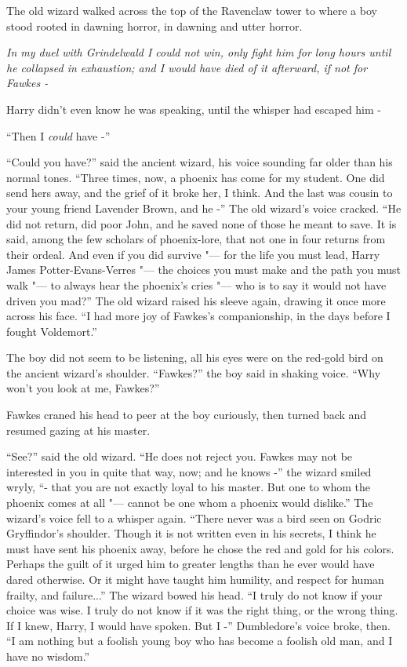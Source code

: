 The old wizard walked across the top of the Ravenclaw tower to where a
boy stood rooted in dawning horror, in dawning and utter horror.

\emph{In my duel with Grindelwald I could not win, only fight him for
long hours until he collapsed in exhaustion; and I would have died of it
afterward, if not for Fawkes -}

Harry didn't even know he was speaking, until the whisper had escaped
him -

``Then I \emph{could} have -''

``Could you have?'' said the ancient wizard, his voice sounding far
older than his normal tones. ``Three times, now, a phoenix has come for
my student. One did send hers away, and the grief of it broke her, I
think. And the last was cousin to your young friend Lavender Brown, and
he -'' The old wizard's voice cracked. ``He did not return, did poor
John, and he saved none of those he meant to save. It is said, among the
few scholars of phoenix-lore, that not one in four returns from their
ordeal. And even if you did survive "--- for the life you must lead, Harry
James Potter-Evans-Verres "--- the choices you must make and the path you
must walk "--- to always hear the phoenix's cries "--- who is to say it would
not have driven you mad?'' The old wizard raised his sleeve again,
drawing it once more across his face. ``I had more joy of Fawkes's
companionship, in the days before I fought Voldemort.''

The boy did not seem to be listening, all his eyes were on the red-gold
bird on the ancient wizard's shoulder. ``Fawkes?'' the boy said in
shaking voice. ``Why won't you look at me, Fawkes?''

Fawkes craned his head to peer at the boy curiously, then turned back
and resumed gazing at his master.

``See?'' said the old wizard. ``He does not reject you. Fawkes may not
be interested in you in quite that way, now; and he knows -'' the wizard
smiled wryly, ``- that you are not exactly loyal to his master. But one
to whom the phoenix comes at all "--- cannot be one whom a phoenix would
dislike.'' The wizard's voice fell to a whisper again. ``There never was
a bird seen on Godric Gryffindor's shoulder. Though it is not written
even in his secrets, I think he must have sent his phoenix away, before
he chose the red and gold for his colors. Perhaps the guilt of it urged
him to greater lengths than he ever would have dared otherwise. Or it
might have taught him humility, and respect for human frailty, and
failure...'' The wizard bowed his head. ``I truly do not know if
your choice was wise. I truly do not know if it was the right thing, or
the wrong thing. If I knew, Harry, I would have spoken. But I -''
Dumbledore's voice broke, then. ``I am nothing but a foolish young boy
who has become a foolish old man, and I have no wisdom.''


